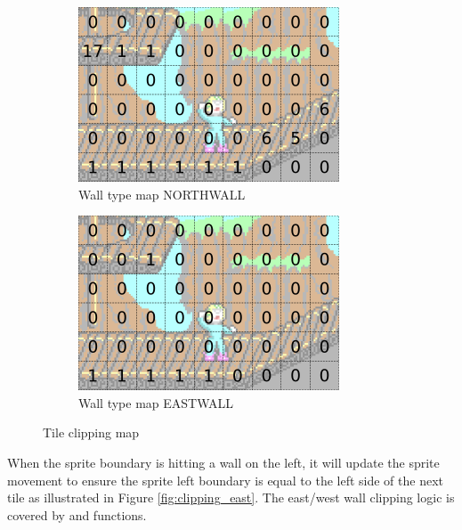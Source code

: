 \documentclass[book.tex]{subfiles}
\begin{document}
\begin{figure}[H]
\centering
\begin{subfigure}{.5\textwidth}
  \centering
  \includegraphics[width=.9\textwidth]{screenshots_300dpi/game/clip_tinf_1.png}
  \caption{Wall type map NORTHWALL}
  \label{fig:clip_tinf_n}
\end{subfigure}%
\begin{subfigure}{.5\textwidth}
  \centering
  \includegraphics[width=.9\textwidth]{screenshots_300dpi/game/clip_tinf_east.png}
  \caption{Wall type map EASTWALL}
  \label{fig:clip_tinf_e}
\end{subfigure}
\caption{Tile clipping map}
\label{fig:clip_tinf}
\end{figure}

\par
When the sprite boundary is hitting a wall on the left, it will update the sprite movement to ensure the sprite left boundary is equal to the left side of the next tile as illustrated in Figure \ref{fig:clipping_east}. The east/west wall clipping logic is covered by  and  functions. \\
\end{document}

